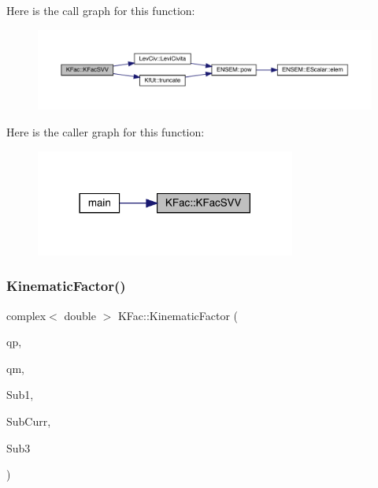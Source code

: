 Here is the call graph for this function\+:
\nopagebreak
\begin{figure}[H]
\begin{center}
\leavevmode
\includegraphics[width=350pt]{d2/d89/namespaceKFac_a9c2aaf9fd1ca6172ffc09b8cf0c30d0e_cgraph}
\end{center}
\end{figure}
Here is the caller graph for this function\+:
\nopagebreak
\begin{figure}[H]
\begin{center}
\leavevmode
\includegraphics[width=242pt]{d2/d89/namespaceKFac_a9c2aaf9fd1ca6172ffc09b8cf0c30d0e_icgraph}
\end{center}
\end{figure}
\mbox{\label{namespaceKFac_a56130e258872427e83c530a5a471cf5c}} 
\subsubsection{\texorpdfstring{KinematicFactor()}{KinematicFactor()}}
{\footnotesize\ttfamily complex$<$ double $>$ K\+Fac\+::\+Kinematic\+Factor (\begin{DoxyParamCaption}\item[{Eigen\+::\+Vector\+Xd \&}]{qp,  }\item[{Eigen\+::\+Vector\+Xd \&}]{qm,  }\item[{Eigen\+::\+Matrix\+Xcd \&}]{Sub1,  }\item[{Eigen\+::\+Matrix\+Xcd \&}]{Sub\+Curr,  }\item[{Eigen\+::\+Matrix\+Xcd \&}]{Sub3 }\end{DoxyParamCaption})}

